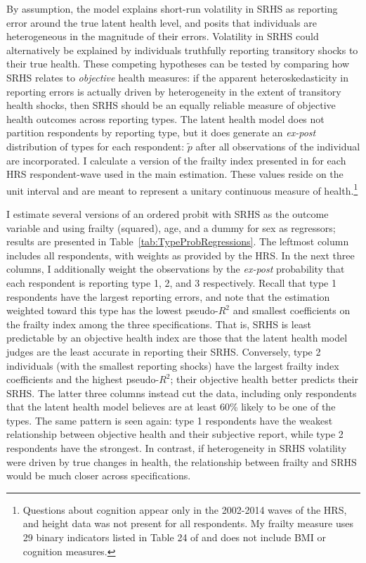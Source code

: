 \documentclass[12pt,pdftex,letterpaper]{article}
\newcommand{\TypeProb}{p}
\newcommand{\TypeProbPcvd}{\widetilde{\TypeProb}}
\newcommand{\RootDir}{..}
\newcommand{\TablesDir}{\RootDir/Tables}
\begin{document}
By assumption, the model explains short-run volatility in SRHS as reporting error around the true latent health level, and posits that individuals are heterogeneous in the magnitude of their errors. Volatility in SRHS could alternatively be explained by individuals truthfully reporting transitory shocks to their true health. These competing hypotheses can be tested by comparing how SRHS relates to \textit{objective} health measures: if the apparent heteroskedasticity in reporting errors is actually driven by heterogeneity in the extent of transitory health shocks, then SRHS should be an equally reliable measure of objective health outcomes across reporting types. The latent health model does not partition respondents by reporting type, but it does generate an \textit{ex-post} distribution of types for each respondent: $\TypeProbPcvd$ after all observations of the individual are incorporated. I calculate a version of the frailty index presented in \cite{HosseiniZhao21a} for each HRS respondent-wave used in the main estimation. These values reside on the unit interval and are meant to represent a unitary continuous measure of health.\footnote{Questions about cognition appear only in the 2002-2014 waves of the HRS, and height data was not present for all respondents. My frailty measure uses 29 binary indicators listed in Table 24 of \cite{HosseiniZhao21a} and does not include BMI or cognition measures.}



I estimate several versions of an ordered probit with SRHS as the outcome variable and using frailty (squared), age, and a dummy for sex as regressors; results are presented in Table~\ref{tab:TypeProbRegressions}. The leftmost column includes all respondents, with weights as provided by the HRS. In the next three columns, I additionally weight the observations by the \textit{ex-post} probability that each respondent is reporting type 1, 2, and 3 respectively. Recall that type 1 respondents have the largest reporting errors, and note that the estimation weighted toward this type has the lowest pseudo-$R^2$ and smallest coefficients on the frailty index among the three specifications. That is, SRHS is least predictable by an objective health index are those that the latent health model judges are the least accurate in reporting their SRHS. Conversely, type 2 individuals (with the smallest reporting shocks) have the largest frailty index coefficients and the highest pseudo-$R^2$; their objective health better predicts their SRHS. The latter three columns instead cut the data, including only respondents that the latent health model believes are at least 60\% likely to be one of the types. The same pattern is seen again: type 1 respondents have the weakest relationship between objective health and their subjective report, while type 2 respondents have the strongest. In contrast, if heterogeneity in SRHS volatility were driven by true changes in health, the relationship between frailty and SRHS would be much closer across specifications.
\end{document}
